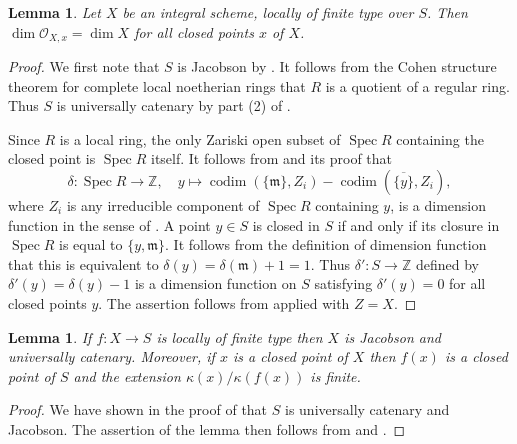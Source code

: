 \documentclass{amsart}
\newtheorem{lem}[prop]{Lemma}
\theoremstyle{definition}
\theoremstyle{remark}
\DeclareMathOperator{\Spec}{Spec}
\DeclareMathOperator{\codim}{codim}
\newcommand{\ZZ}{\mathbb Z}
\newcommand{\mm}{\mathfrak m}
\newcommand{\OO}{\mathcal O}
\begin{document}
\begin{lem}\label{main_dim_codim} Let $X$ be an integral scheme, locally of finite type over $S$. Then $\dim \OO_{X,x}=\dim X$ for 
all closed points $x$ of $X$. 
\end{lem}
\begin{proof} 
We first note that $S$ is Jacobson by  \cite[\href{https://stacks.math.columbia.edu/tag/02IM}{Tag 02IM}]{stacks-project}. It follows from the
Cohen structure theorem for complete local noetherian rings that $R$ is a quotient of a regular ring. Thus $S$ is universally catenary by part (2) of \cite[\href{https://stacks.math.columbia.edu/tag/02JB}{Tag 02JB}]{stacks-project}.

Since $R$ is a local ring, the only Zariski open subset of $\Spec R$ containing the closed point is $\Spec R$ 
itself. It follows from 
\cite[\href{https://stacks.math.columbia.edu/tag/02IC}{Tag 02IC}]{stacks-project}
and its proof 
that $$\delta: \Spec R \rightarrow \ZZ, 
\quad y \mapsto \codim( \{\mm\}, Z_i)-\codim(\overline{\{y\}}, Z_i),$$ 
where $Z_i$ is 
any irreducible component of $\Spec R$ containing $y$, 
is a dimension function in the sense of \cite[\href{https://stacks.math.columbia.edu/tag/02I9}{Tag 02I9}]{stacks-project}. A point $y\in S$ is closed 
in $S$ if and only if its closure in $\Spec R$ is 
equal to $\{y, \mm\}$. It follows from the 
definition of dimension function that this is 
equivalent to $\delta(y)=\delta(\mm)+1=1$.
Thus $\delta': S \rightarrow \ZZ$
defined by $\delta'(y)=\delta(y)-1$ is a dimension 
function on $S$ satisfying $\delta'(y)=0$ for all closed points $y$. The assertion follows from \cite[\href{https://stacks.math.columbia.edu/tag/02QO}{Tag 02QO}]{stacks-project} applied with $Z=X$. 
\end{proof} 

\begin{lem} If $f: X\rightarrow S$ is locally of finite type
then $X$ is Jacobson and universally catenary. Moreover, if $x$ is a closed point of $X$ then $f(x)$ is a closed point of $S$ and 
the extension $\kappa(x)/\kappa(f(x))$ is finite. 
\end{lem}
\begin{proof} We have shown in the proof of  that $S$ is universally catenary and Jacobson. The assertion of the lemma then follows from
\cite[\href{https://stacks.math.columbia.edu/tag/02J5}{Tag 02J5}]{stacks-project} and
\cite[\href{https://stacks.math.columbia.edu/tag/01TB}{Tag 01TB}]{stacks-project}.
\end{proof} 
\end{document}
